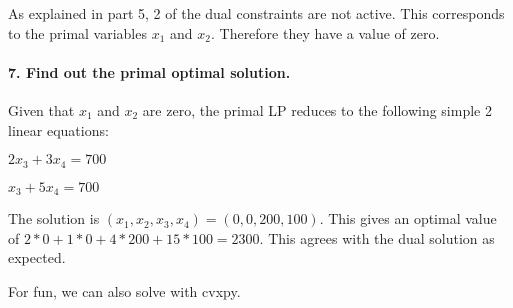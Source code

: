 \documentclass[11pt]{article}
\begin{document}
As explained in part 5, 2 of the dual constraints are not active. This
corresponds to the primal variables \(x_1\) and \(x_2\). Therefore they
have a value of zero.

    \hypertarget{find-out-the-primal-optimal-solution.}{%
\paragraph{7. Find out the primal optimal
solution.}\label{find-out-the-primal-optimal-solution.}}

Given that \(x_1\) and \(x_2\) are zero, the primal LP reduces to the
following simple 2 linear equations:

\(2x_3 + 3x_4 = 700\)

\(x_3 + 5x_4 = 700\)

The solution is \((x_1, x_2, x_3, x_4) = (0, 0, 200, 100)\). This gives
an optimal value of \(2*0 + 1*0 + 4*200 + 15*100 = 2300\). This agrees
with the dual solution as expected.

For fun, we can also solve with cvxpy.
\end{document}
